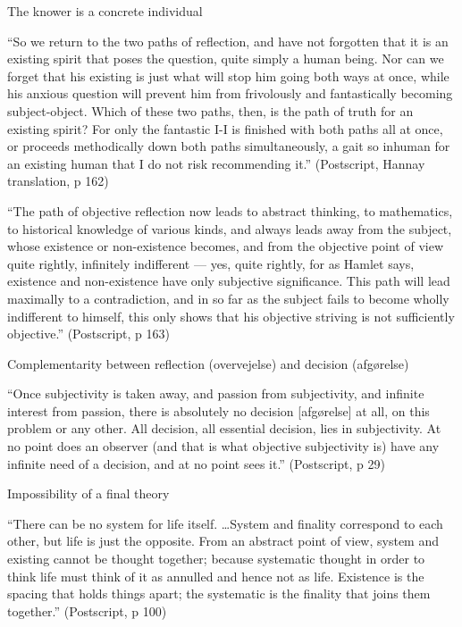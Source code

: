 \documentclass[ignorenonframetext, ]{beamer}
\begin{document}
\begin{frame}{The knower is a concrete individual}

  ``So we return to the two paths of reflection, and have not
  forgotten that it is an existing spirit that poses the question,
  quite simply a human being. Nor can we forget that his existing is
  just what will stop him going both ways at once, while his anxious
  question will prevent him from frivolously and fantastically
  becoming subject-object. Which of these two paths, then, is the path
  of truth for an existing spirit? For only the fantastic I-I is
  finished with both paths all at once, or proceeds methodically down
  both paths simultaneously, a gait so inhuman for an existing human
  that I do not risk recommending it.'' (Postscript, Hannay
  translation, p 162)


\end{frame}

\begin{frame}

  ``The path of objective reflection now leads to abstract thinking,
  to mathematics, to historical knowledge of various kinds, and always
  leads away from the subject, whose existence or non-existence
  becomes, and from the objective point of view quite rightly,
  infinitely indifferent --- yes, quite rightly, for as Hamlet says,
  existence and non-existence have only subjective significance. This
  path will lead maximally to a contradiction, and in so far as the
  subject fails to become wholly indifferent to himself, this only
  shows that his objective striving is not sufficiently objective.''
  (Postscript, p 163)

\end{frame}

\begin{frame}{Complementarity between reflection (overvejelse) and
    decision (afgørelse)}

  ``Once subjectivity is taken away, and passion from subjectivity,
  and infinite interest from passion, there is absolutely no decision
  [afgørelse] at all, on this problem or any other. All decision, all
  essential decision, lies in subjectivity. At no point does an
  observer (and that is what objective subjectivity is) have any
  infinite need of a decision, and at no point sees it.'' (Postscript,
  p 29)

\end{frame}

\begin{frame}{Impossibility of a final theory}

  ``There can be no system for life itself. \dots System and finality
  correspond to each other, but life is just the opposite. From an
  abstract point of view, system and existing cannot be thought
  together; because systematic thought in order to think life must
  think of it as annulled and hence not as life. Existence is the
  spacing that holds things apart; the systematic is the finality that
  joins them together.'' (Postscript, p 100)

\end{frame}
\end{document}
